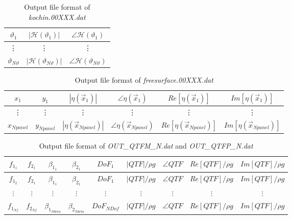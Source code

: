 \documentclass[12pt,a4paper,titlepage]{article}
\begin{document}
\begin{table}[ht]
\begin{center}
\caption{Output file format of \textit{kochin.00XXX.dat}}\label{tab:kochin}
\begin{tabular}{ccc}
\hline
$\vartheta_1$ &$|\mathcal{H}(\vartheta_1)|$ & $\angle \mathcal{H}(\vartheta_1)$\\
\hline
\vdots &\vdots &\vdots
\\
\hline
$\vartheta_{N\vartheta}$ &$|\mathcal{H}(\vartheta_{N\vartheta})|$ & $\angle \mathcal{H}(\vartheta_{N\vartheta})$\\
\hline
\end{tabular}
\end{center}
\end{table}

\begin{table}[ht]
\begin{center}
\caption{Output file format of \textit{freesurface.00XXX.dat}}\label{tab:freesurface}
\begin{tabular}{cccccc}
\hline
$x_1$ &$y_1$ &$|\eta(\vec{x}_1)|$ & $\angle \eta(\vec{x}_1)$ &$Re[ \eta(\vec{x}_1)]$ &$Im[ \eta(\vec{x}_1)]$\\
\hline
\vdots &\vdots &\vdots &\vdots &\vdots &\vdots
\\
\hline
$x_{Npanel}$ &$y_{Npanel}$ &$|\eta(\vec{x}_{Npanel})|$ & $\angle \eta(\vec{x}_{Npanel})$ &$Re[ \eta(\vec{x}_{Npanel})]$ &$Im[ \eta(\vec{x}_{Npanel})]$\\
\hline
\end{tabular}
\end{center}
\end{table}

\begin{table}[ht]
\begin{center}
\caption{Output file format of \textit{OUT\_QTFM\_N.dat} and \textit{OUT\_QTFP\_N.dat}}\label{tab:QTF}
\begin{tabular}{ccccccccc}
\hline
$f_{1_1}$& $f_{2_1}$ & $\beta_{1_1}$& $\beta_{2_1}$ & $DoF_1$ & $|QTF|/\rho g$& $\angle QTF$& $Re[QTF]/\rho g$& $Im[QTF]/\rho g$\\
\hline
$f_{1_2}$& $f_{2_1}$ & $\beta_{1_1}$& $\beta_{2_1}$ & $DoF_1$ & $|QTF|/\rho g$& $\angle QTF$& $Re[QTF]/\rho g$& $Im[QTF]/\rho g$\\
\hline
$\vdots$&$\vdots$&$\vdots$&$\vdots$&$\vdots$&$\vdots$&$\vdots$&$\vdots$&$\vdots$\\
\hline
$f_{1_{Nf}}$& $f_{2_{Nf}}$ & $\beta_{1_{Nbeta}}$& $\beta_{2_{Nbeta}}$ & $DoF_{NDof}$ & $|QTF|/\rho g$& $\angle QTF$& $Re[QTF]/\rho g$& $Im[QTF]/\rho g$\\
\hline
\end{tabular}
\end{center}
\end{table}
\end{document}
